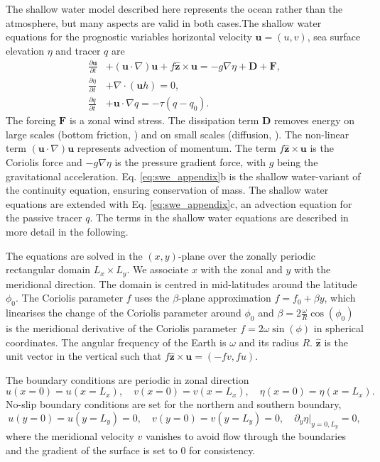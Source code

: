 The shallow water model described here represents the ocean rather than the atmosphere, but many aspects are valid
in both cases.The shallow water equations for the prognostic variables horizontal velocity $\mathbf{u} = (u,v)$, sea
surface elevation $\eta$ and tracer $q$ are
\begin{subequations}
\begin{align}
\frac{\partial \mathbf{u}}{\partial t} &+ (\mathbf{u} \cdot \nabla) \mathbf{u} +
f\hat{\mathbf{z}} \times \mathbf{u} = -g\nabla \eta + \mathbf{D} + \mathbf{F}, \\
\frac{\partial \eta}{\partial t} &+ \nabla \cdot (\mathbf{u}h) = 0, \\
\frac{\partial q}{\partial t} &+ \mathbf{u} \cdot \nabla q = -\tau(q - q_0).
\end{align}
\label{eq:swe_appendix}%
\end{subequations}
The forcing $\mathbf{F}$ is a zonal wind stress. The dissipation term $\mathbf{D}$ removes energy on large scales (bottom friction, \cite{Arbic2008})
and on small scales (diffusion, \citep{Griffies2000}). The non-linear term $(\mathbf{u} \cdot \nabla) \mathbf{u}$ represents advection of
momentum. The term $f\hat{\mathbf{z}} \times \mathbf{u}$ is the Coriolis force and $-g\nabla \eta$ is the pressure gradient
force, with $g$ being the gravitational acceleration. Eq. \ref{eq:swe_appendix}b is the shallow water-variant of the continuity equation,
ensuring conservation of mass. The shallow water equations are extended with Eq. \ref{eq:swe_appendix}c, an advection equation for
the passive tracer $q$. The terms in the shallow water equations are described in more detail in the following.

The equations are solved in the $(x,y)$-plane over the zonally periodic rectangular domain $L_x \times L_y$.
We associate $x$ with the zonal and $y$ with the meridional direction. The domain is centred in mid-latitudes around the latitude $\phi_0$.
The Coriolis parameter $f$ uses the $\beta$-plane approximation $f = f_0 + \beta y$, which linearises the change of the Coriolis parameter
around $\phi_0$ \citep{Vallis2006} and $\beta = 2\tfrac{\omega}{R}\cos(\phi_0)$ is the meridional derivative of the
Coriolis parameter $f = 2\omega \sin(\phi)$ in spherical coordinates. The angular frequency of the Earth is $\omega$ and its radius $R$.
$\hat{\mathbf{z}}$ is the unit vector in the vertical such that $f\hat{\mathbf{z}} \times \mathbf{u} = (-fv,fu)$.

The boundary conditions are periodic in zonal direction
\begin{equation}
u(x=0) = u(x=L_x), \quad v(x=0) = v(x=L_x), \quad \eta(x=0) = \eta(x=L_x).
\end{equation}
No-slip boundary conditions are set for the northern and southern boundary,
\begin{equation}
u(y=0) = u(y=L_y) = 0, \quad v(y=0) = v(y=L_y) = 0, \quad \partial_y\eta \vert_{y=0,L_y} = 0,
\end{equation}
where the meridional velocity $v$ vanishes to avoid flow through the boundaries and the gradient
of the surface is set to 0 for consistency.

